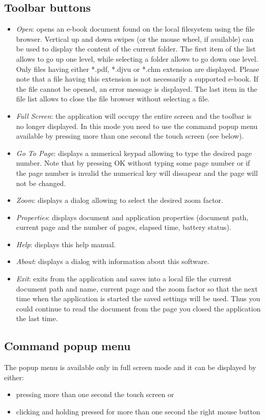 \documentclass[journal,12pt]{IEEEtran}
\begin{document}
\subsection{Toolbar buttons}
\begin{itemize}
 \item \textit{Open}: opens an e-book document found on the local filesystem using the file browser. Vertical up and down swipes (or the mouse wheel, if available) can be used to display the content of the current folder. The first item of the list allows to go up one level, while selecting a folder allows to go down one level. Only files having either *.pdf, *.djvu or *.chm extension are displayed. Please note that a file having this extension is not necessarily a supported e-book. If the file cannot be opened, an error message is displayed. The last item in the file list allows to close the file browser without selecting a file.
 \item \textit{Full Screen}: the application will occupy the entire screen and the toolbar is no longer displayed. In this mode you need to use the command popup menu available by pressing more than one second the touch screen (see below).
 \item \textit{Go To Page}: displays a numerical keypad allowing to type the desired page number. Note that by pressing OK without typing some page number or if the page number is invalid the numerical key will dissapear and the page will not be changed.
 \item \textit{Zoom}: displays a dialog allowing to select the desired zoom factor.
 \item \textit{Properties}: displays document and application properties (document path, current page and the number of pages, elapsed time, battery status).
 \item \textit{Help}: displays this help manual.
 \item \textit{About}: displays a dialog with information about this software.
 \item \textit{Exit}: exits from the application and saves into a local file the current document path and name, current page and the  zoom factor so that the next time when the application is started the saved settings will be used. Thus you could continue to read the document from the page you closed the application the last time.
\end{itemize}

\subsection{Command popup menu}
The popup menu is available only in full screen mode and it can be displayed by either:
\begin{itemize}
 \item pressing more than one second the touch screen or
 \item clicking and holding pressed for more than one second the right mouse button
\end{itemize}
\end{document}
